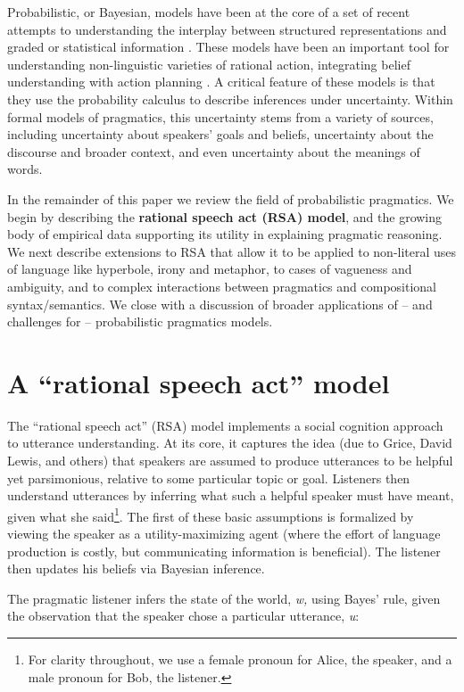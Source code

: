 \documentclass[]{elsarticle}
\begin{document}
Probabilistic, or Bayesian, models have been at the core of a set of
recent attempts to understanding the interplay between structured
representations and graded or statistical information \citep{Tenenbaum2011}. 
These models have been an important tool for understanding
non-linguistic varieties of rational action, integrating belief
understanding with action planning \citep{baker2009}. A
critical feature of these models is that they use the probability
calculus to describe inferences under uncertainty. Within formal models
of pragmatics, this uncertainty stems from a variety of sources,
including uncertainty about speakers' goals and beliefs, uncertainty
about the discourse and broader context, and even uncertainty about the
meanings of words.

In the remainder of this paper we review the field of probabilistic
pragmatics. We begin by describing the \textbf{rational speech act
(RSA) model}, and the growing body of empirical data supporting its
utility in explaining pragmatic reasoning. We next describe extensions
to RSA that allow it to be applied to non-literal uses of language like
hyperbole, irony and metaphor, to cases of vagueness and ambiguity, and
to complex interactions between pragmatics and compositional
syntax/semantics. We close with a discussion of broader applications of
-- and challenges for -- probabilistic pragmatics models.

\section{A ``rational speech act'' model}\label{a-rational-speech-act-model}

The ``rational speech act'' (RSA) model implements a social
cognition approach to utterance understanding. At its core, it captures
the idea (due to Grice, David Lewis, and others) that speakers are assumed to
produce utterances to be helpful yet parsimonious, relative to some
particular topic or goal. Listeners then understand utterances by
inferring what such a helpful speaker must have meant, given what she
said\footnote{For clarity throughout, we use a female pronoun for Alice, the speaker, and a male pronoun for Bob, the listener.}. 
The first of these basic assumptions is formalized by viewing the speaker
as a utility-maximizing agent (where the effort of language production
is costly, but communicating information is beneficial). The listener then
updates his beliefs via Bayesian inference.

The pragmatic listener infers the state of the world, \emph{w,} using
Bayes' rule, given the observation that the speaker chose a particular
utterance, \emph{u}:
\end{document}

